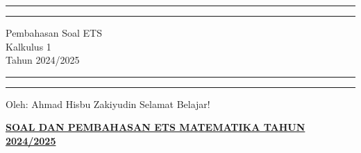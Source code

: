 \documentclass[10pt,openany,a4paper]{article}
\theoremstyle{definition}
\theoremstyle{definition}
\theoremstyle{plain}
\begin{document}
\begin{titlepage}
	\centering %
	\vspace*{1.5\baselineskip} %

	\rule{13cm}{1.6pt}\vspace*{-\baselineskip}\vspace*{2pt} %
	\rule{13cm}{0.4pt} %
	
		\vspace{0.75\baselineskip} %
	{	\Huge Pembahasan Soal ETS\\ 
			\vspace{4mm}
		Kalkulus 1 \\ \vspace{2mm} \huge{Tahun 2024/2025}\\	}
		\vspace{0.75\baselineskip} %
	\rule{13cm}{0.4pt}\vspace*{-\baselineskip}\vspace{3.2pt} %
	\rule{13cm}{1.6pt} %
	
		\vspace{1.75\baselineskip} %
{\large Oleh: Ahmad Hisbu Zakiyudin}
	\vfill
	\vspace{1mm}
\huge{Selamat Belajar!}
\end{titlepage}
\makeatletter
\setlength\fboxsep{3pt}
\setlength{\headheight}{24pt}
 \begin{center}
	{\underline{\textbf{\MakeUppercase{Soal dan Pembahasan ETS Matematika Tahun 2024/2025}}}}
    \end{center}
\end{document}
